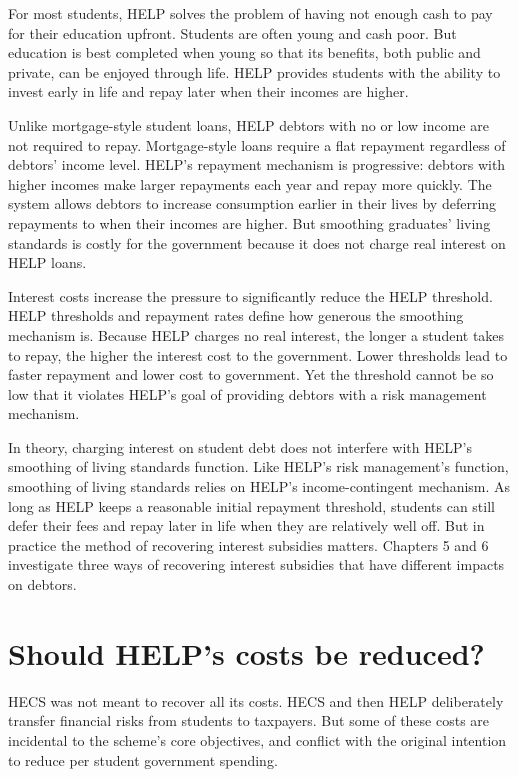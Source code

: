 \documentclass[embargoed]{grattan}
\begin{document}
For most students, \gls{HELP} solves the problem of having not enough cash to pay for their education upfront.
Students are often young and cash poor.
But education is best completed when young so that its benefits, both public and private, can be enjoyed through life.
\gls{HELP} provides students with the ability to invest early in life and repay later when their incomes are higher.

Unlike mortgage-style student loans, \gls{HELP} debtors with no or low income are not required to repay.
Mortgage-style loans require a flat repayment regardless of debtors' income level.
\gls{HELP}'s repayment mechanism is progressive: debtors with higher incomes make larger repayments each year and repay more quickly.
The system allows debtors to increase consumption earlier in their lives by deferring repayments to when their incomes are higher.
But smoothing graduates' living standards is costly for the government because it does not charge real interest on \gls{HELP} loans.

Interest costs increase the pressure to significantly reduce the \gls{HELP} threshold.
\gls{HELP} thresholds and repayment rates define how generous the smoothing mechanism is.
Because \gls{HELP} charges no real interest, the longer a student takes to repay, the higher the interest cost to the government.
Lower thresholds lead to faster repayment and lower cost to government.
Yet the threshold cannot be so low that it violates \gls{HELP}'s goal of providing debtors with a risk management mechanism.

In theory, charging interest on student debt does not interfere with \gls{HELP}'s smoothing of living standards function.
Like \gls{HELP}'s risk management's function, smoothing of living standards relies on \gls{HELP}'s income-contingent mechanism.
As long as \gls{HELP} keeps a reasonable initial repayment threshold, students can still defer their fees and repay later in life when they are relatively well off. \protect\hypertarget{_Ref435627338}{}{}But in practice the method of recovering interest subsidies matters.
Chapters 5 and 6 investigate three ways of recovering interest subsidies that have different impacts on debtors.

\section[Should {HELP}'s costs be reduced?]{Should \gls{HELP}'s costs be reduced?}\label{should-helps-costs-be-reduced}

\gls{HECS} was not meant to recover all its costs.
\gls{HECS} and then \gls{HELP} deliberately transfer financial risks from students to taxpayers.
But some of these costs are incidental to the scheme's core objectives, and conflict with the original intention to reduce per student government spending.
\end{document}
